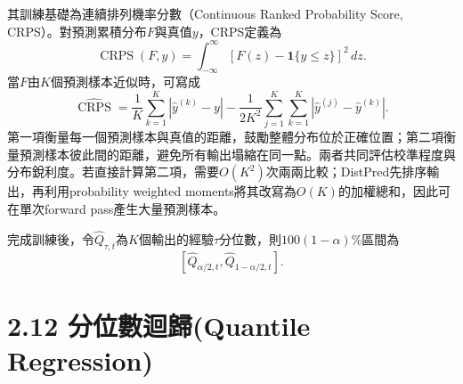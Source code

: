 其訓練基礎為連續排列機率分數（Continuous Ranked Probability Score, CRPS）。對預測累積分布$F$與真值$y$，CRPS定義為\cite{gneiting2007}
\begin{equation}
 \operatorname{CRPS}(F,y)
 =\int_{-\infty}^{\infty}
 \left[F(z)-\mathbf 1\{y\le z\}\right]^2\,dz.
\end{equation}
當$F$由$K$個預測樣本近似時，可寫成
\begin{equation}
 \widehat{\operatorname{CRPS}}
 =\frac{1}{K}\sum_{k=1}^{K}|\widehat y^{(k)}-y|
 -\frac{1}{2K^2}\sum_{j=1}^{K}\sum_{k=1}^{K}
 |\widehat y^{(j)}-\widehat y^{(k)}|.
\end{equation}
第一項衡量每一個預測樣本與真值的距離，鼓勵整體分布位於正確位置；第二項衡量預測樣本彼此間的距離，避免所有輸出塌縮在同一點。兩者共同評估校準程度與分布銳利度。若直接計算第二項，需要$O(K^2)$次兩兩比較；DistPred先排序輸出，再利用probability weighted moments將其改寫為$O(K)$的加權總和，因此可在單次forward pass產生大量預測樣本。

完成訓練後，令$\widehat Q_{\tau,t}$為$K$個輸出的經驗$\tau$分位數，則$100(1-\alpha)\%$區間為
\begin{equation}
 \left[\widehat Q_{\alpha/2,t},
       \widehat Q_{1-\alpha/2,t}\right].
\end{equation}

\section*{2.12 分位數迴歸(Quantile Regression)}

